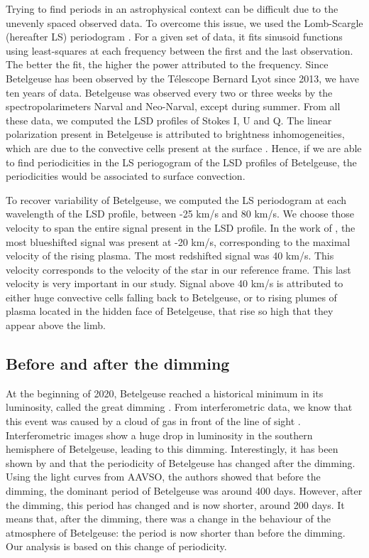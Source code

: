 \documentclass{aa}
\begin{document}
Trying to find periods in an astrophysical context can be difficult due to the unevenly spaced observed data. To overcome this issue, 
we used the Lomb-Scargle (hereafter LS) periodogram \citep{lomb_least-squares_1976,scargle_studies_1982}. For a given set of data, it fits sinusoid functions 
using least-squares at each frequency between the first and the last observation. The better the fit, the higher the power attributed to the frequency. 
Since Betelgeuse has been observed by the Télescope Bernard Lyot since 2013, we have ten years of data. Betelgeuse was observed every two or three weeks by 
the spectropolarimeters Narval and Neo-Narval, except during summer. From all these data, we computed the LSD profiles of Stokes I, U and Q. 
The linear polarization present in Betelgeuse is attributed to brightness inhomogeneities, which are due to the convective cells 
present at the surface \citep{lopez_ariste_convective_2018}. Hence, if we are able to find periodicities in the LS periogogram of the LSD profiles of Betelgeuse,
the periodicities would be associated to surface convection. 

To recover variability of Betelgeuse, 
we computed the LS periodogram at each wavelength of the LSD profile, between -25 km/s and 80 km/s. We choose those velocity to span the entire 
signal present in the LSD profile. In the work of \cite{lopez_ariste_convective_2018}, the most blueshifted signal was present at -20 km/s, 
corresponding to the maximal velocity of the rising plasma. The most redshifted signal was 40 km/s. This velocity corresponds 
to the velocity of the star in our reference frame. This last velocity is very important in our study. Signal above 40 km/s is attributed to either huge
convective cells falling back to Betelgeuse, or to rising plumes of plasma located in the hidden face of Betelgeuse,
that rise so high that they appear above the limb.


\subsection{Before and after the dimming}

At the beginning of 2020, Betelgeuse reached a historical minimum in its luminosity, called the great dimming \citep{guinan_fall_2020}. 
From interferometric data, we know that this event was caused by a cloud of gas in front of the line of sight \citep{montarges_dusty_2021}. 
Interferometric images show a huge drop in luminosity in the southern hemisphere of Betelgeuse, leading to this dimming. Interestingly, 
it has been shown by \cite{jadlovsky_analysis_2023} and \cite{dupree_great_2022} that the periodicity of Betelgeuse has changed after the dimming. Using the light curves from AAVSO, 
the authors showed that before the dimming, the dominant period of Betelgeuse was around 400 days. However, after the dimming, this period has changed and 
is now shorter, around 200 days. It means that, after the dimming, there was a change in the behaviour of the atmosphere of Betelgeuse: the period is now
shorter than before the dimming. Our analysis is based on this change of periodicity.
\end{document}
